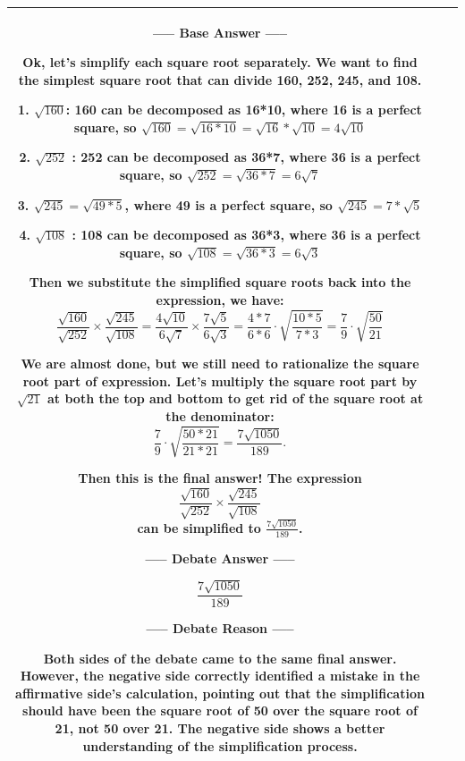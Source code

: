 \begin{table}[h!]
\begin{tabular}{c|c|p{11cm}}
----- Base Answer -----

Ok, let's simplify each square root separately. We want to find the simplest square root that can divide 160, 252, 245, and 108.

1. $\sqrt{160}$: 160 can be decomposed as 16*10, where 16 is a perfect square, so $\sqrt{160} = \sqrt{16*10}=\sqrt{16}*\sqrt{10}=4\sqrt{10}$

2. $\sqrt{252}$ : 252 can be decomposed as 36*7, where 36 is a perfect square, so  $\sqrt{252}=\sqrt{36*7}=6\sqrt{7}$

3. $\sqrt{245} = \sqrt{49*5}$, where 49 is a perfect square, so $\sqrt{245}=7*\sqrt{5}$

4. $\sqrt{108}$  : 108 can be decomposed as 36*3, where 36 is a perfect square, so $\sqrt{108} = \sqrt{36*3}=6\sqrt{3}$

Then we substitute the simplified square roots back into the expression, we have:
$$\frac{\sqrt{160}}{\sqrt{252}}\times\frac{\sqrt{245}}{\sqrt{108}}=\frac{4\sqrt{10}}{6\sqrt{7}}\times\frac{7\sqrt{5}}{6\sqrt{3}}=\frac{4*7}{6*6}\cdot\sqrt{\frac{10*5}{7*3}}=\frac{7}{9}\cdot\sqrt{\frac{50}{21}}$$

We are almost done, but we still need to rationalize the square root part of expression. Let's multiply the square root part by $\sqrt{21}$ at both the top and bottom to get rid of the square root at the denominator: $$\frac{7}{9}\cdot\sqrt{\frac{50*21}{21*21}}=\frac{7\sqrt{1050}}{189}.$$

Then this is the final answer! The expression $$\frac{\sqrt{160}}{\sqrt{252}}\times\frac{\sqrt{245}}{\sqrt{108}}$$ can be simplified to $\frac{7\sqrt{1050}}{189}$.

----- Debate Answer -----

$$\frac{7\sqrt{1050}}{189}$$

----- Debate Reason -----

Both sides of the debate came to the same final answer. However, the negative side correctly identified a mistake in the affirmative side's calculation, pointing out that the simplification should have been the square root of 50 over the square root of 21, not 50 over 21. The negative side shows a better understanding of the simplification process.
   \\
\bottomrule
\end{tabular}
\end{table}


